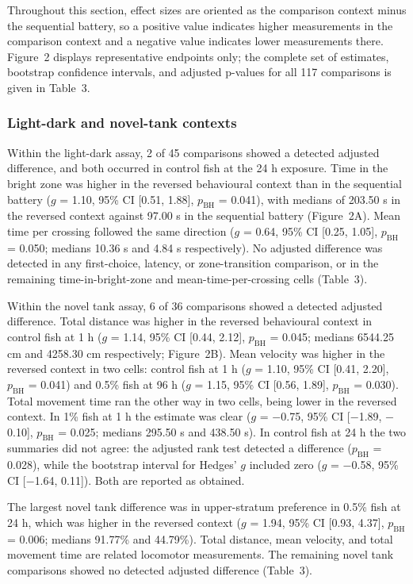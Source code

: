 \documentclass[12pt,a4paper]{article}
\begin{document}
Throughout this section, effect sizes are oriented as the comparison context minus the sequential battery, so a positive value indicates higher measurements in the comparison context and a negative value indicates lower measurements there. Figure~2 displays representative endpoints only; the complete set of estimates, bootstrap confidence intervals, and adjusted p-values for all 117 comparisons is given in Table~3.

\subsubsection{Light-dark and novel-tank contexts}
\label{sec-3-2-2}

Within the light-dark assay, 2 of 45 comparisons showed a detected adjusted difference, and both occurred in control fish at the 24 h exposure. Time in the bright zone was higher in the reversed behavioural context than in the sequential battery ($g$ = 1.10, 95\% CI [0.51, 1.88], $p_{\mathrm{BH}}$ = 0.041), with medians of 203.50 s in the reversed context against 97.00 s in the sequential battery (Figure~2A). Mean time per crossing followed the same direction ($g$ = 0.64, 95\% CI [0.25, 1.05], $p_{\mathrm{BH}}$ = 0.050; medians 10.36 s and 4.84 s respectively). No adjusted difference was detected in any first-choice, latency, or zone-transition comparison, or in the remaining time-in-bright-zone and mean-time-per-crossing cells (Table~3).

Within the novel tank assay, 6 of 36 comparisons showed a detected adjusted difference. Total distance was higher in the reversed behavioural context in control fish at 1 h ($g$ = 1.14, 95\% CI [0.44, 2.12], $p_{\mathrm{BH}}$ = 0.045; medians 6544.25 cm and 4258.30 cm respectively; Figure~2B). Mean velocity was higher in the reversed context in two cells: control fish at 1 h ($g$ = 1.10, 95\% CI [0.41, 2.20], $p_{\mathrm{BH}}$ = 0.041) and 0.5\% fish at 96 h ($g$ = 1.15, 95\% CI [0.56, 1.89], $p_{\mathrm{BH}}$ = 0.030). Total movement time ran the other way in two cells, being lower in the reversed context. In 1\% fish at 1 h the estimate was clear ($g$ = $-$0.75, 95\% CI [$-$1.89, $-$0.10], $p_{\mathrm{BH}}$ = 0.025; medians 295.50 s and 438.50 s). In control fish at 24 h the two summaries did not agree: the adjusted rank test detected a difference ($p_{\mathrm{BH}}$ = 0.028), while the bootstrap interval for Hedges' $g$ included zero ($g$ = $-$0.58, 95\% CI [$-$1.64, 0.11]). Both are reported as obtained.

The largest novel tank difference was in upper-stratum preference in 0.5\% fish at 24 h, which was higher in the reversed context ($g$ = 1.94, 95\% CI [0.93, 4.37], $p_{\mathrm{BH}}$ = 0.006; medians 91.77\% and 44.79\%). Total distance, mean velocity, and total movement time are related locomotor measurements. The remaining novel tank comparisons showed no detected adjusted difference (Table~3).
\end{document}
